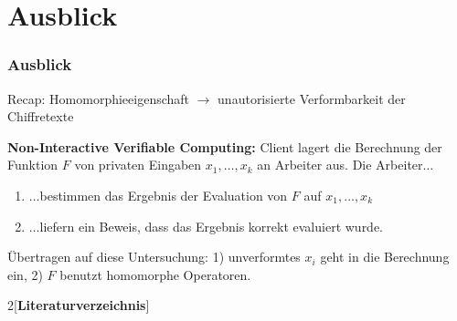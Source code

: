 \documentclass[handout,usenames,dvipsnames]{beamer}
\begin{document}
\section{Ausblick}		

\begin{frame}
	\frametitle{Ausblick}
	
	
	Recap: Homomorphieeigenschaft $\rightarrow$ unautorisierte Verformbarkeit der Chiffretexte\newline
	
	\textbf{Non-Interactive Verifiable Computing:}
	Client lagert die Berechnung der Funktion $F$ von privaten Eingaben $x_1,\ldots,x_k$ an Arbeiter aus. Die Arbeiter$\ldots$
	\begin{enumerate}
		\item $\ldots$bestimmen das Ergebnis der Evaluation von $F$ auf $x_1,\ldots,x_k$
		\item $\ldots$liefern ein Beweis, dass das Ergebnis korrekt evaluiert wurde.
	\end{enumerate}

	Übertragen auf diese Untersuchung: 1) unverformtes $x_i$ geht in die Berechnung ein, 2) $F$ benutzt homomorphe Operatoren.
	
	
	
	
	
\end{frame}

	

	
	

	
	

	



	\begin{multicols}{2}[\textbf{Literaturverzeichnis}]
		\fontsize{2.5}{4}\selectfont 
		
		
	\end{multicols}
\end{document}
